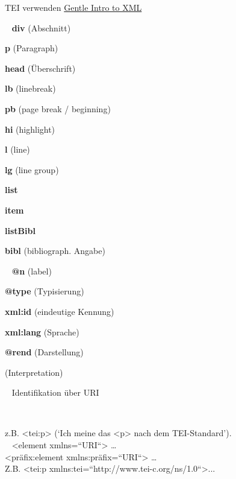 \begin{frame}{TEI verwenden}
\footnotesize
\href{http://www.tei-c.org/release/doc/tei-p5-doc/en/html/SG.html}{Gentle Intro to XML}

~ \textbf{div} (Abschnitt) \item \textbf{p} (Paragraph) \item \textbf{head} (Überschrift) \item \textbf{lb} (linebreak) \item \textbf{pb} (page break / beginning) \item \textbf{hi} (highlight) \item \textbf{l} (line) \item \textbf{lg} (line group) \item \textbf{list} \item \textbf{item} \item \textbf{listBibl} \item \textbf{bibl} (bibliograph. Angabe)

~ \textbf{@n} (label) \item \textbf{@type} (Typisierung) \item \textbf{xml:id} (eindeutige Kennung) \item \textbf{xml:lang} (Sprache) \item \textbf{@rend} (Darstellung) \item {} (Interpretation)


~ Identifikation über URI \item {}~ \item z.B. <tei:p> (`Ich meine das <p> nach dem TEI-Standard'). \\
~ <element xmlns=“URI“> \dots \\
<präfix:element xmlns:präfix=“URI“> \dots \\
Z.B. <tei:p xmlns:tei=“http://www.tei-c.org/ns/1.0“>...


\end{frame}



